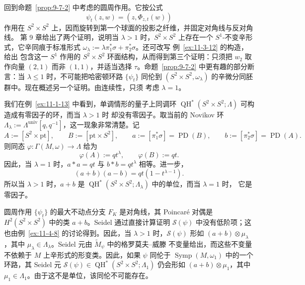 \begin{example}\label{ex:11-4-9}
回到命题~\ref{prop:9-7-2} 中考虑的圆周作用。它按公式
\[
  \psi_t(z,w)=(z,\Phi_{z,t}(w))
\]
作用在 $S^2\times S^2$ 上，因而旋转到第一个球面的投影之纤维，并固定对角线与反对角线。
第 9 章给出了两个证明，说明当 $\lambda>1$ 时，$S^2\times S^2$ 上存在一个
$S^1$-不变辛形式，它辛同痕于标准形式
$\omega_\lambda:=\lambda\pi_1^*\sigma+\pi_2^*\sigma$。还可改写
例~\ref{ex:11-3-12} 的构造，给出
包含这一 $S^1$ 作用的 $S^2\times S^2$ 环面结构，从而得到第三个证明：只须把
$w_2$ 取作向量 $(2,1)$ 而非 $(1,1)$，并适当选择 $\tau$。命题~\ref{prop:9-7-2}
中更有趣的部分断言：当 $\lambda\le1$ 时，不可能把哈密顿环路 $\{\psi_t\}$ 同伦到
$(S^2\times S^2,\omega_\lambda)$ 的辛微分同胚群中。现在概述另一个证明。由连续性，只须
考虑 $\lambda=1$。

我们在例~\ref{ex:11-1-13} 中看到，单调情形的量子上同调环
$\operatorname{QH}^*(S^2\times S^2;\Lambda)$ 可构造成有零因子的环，而当 $\lambda>1$ 时
却没有零因子。取当前的 Novikov 环
$\Lambda_\lambda:=\Lambda^{\mathrm{univ}}[q,q^{-1}]$，这一现象非常清楚。记
\[
  A:=[S^2\times\mathrm{pt}],\qquad
  B:=[\mathrm{pt}\times S^2],\qquad
  a:=[\pi_1^*\sigma]=\operatorname{PD}(B),\qquad
  b:=[\pi_2^*\sigma]=\operatorname{PD}(A).
\]
则同态 $\varphi:\Gamma(M,\omega)\to\Lambda$ 给为
\[
  \varphi(A):=qt^\lambda,
  \qquad
  \varphi(B):=qt.
\]
因此，当 $\lambda=1$ 时，$a*a=qt$ 与 $b*b=qt^\lambda$ 相等。进一步，
\[
  (a+b)(a-b)=qt(1-t^{\lambda-1}).
\]
所以当 $\lambda>1$ 时，$a+b$ 是
$\operatorname{QH}^*(S^2\times S^2;\Lambda_\lambda)$ 中的单位，而当 $\lambda=1$ 时，
它是零因子。

圆周作用 $\{\psi_t\}$ 的最大不动点分支 $F_K$ 是对角线，其 Poincar\'e 对偶是
$H^2(S^2\times S^2)$ 中的类 $a+b$。Seidel  通过直接计算证明
$\mathcal S(\psi)$ 中没有低阶项；这也由例~\ref{ex:11-4-8} 的讨论得到。因此，当
$\lambda>1$ 时，$\mathcal S(\psi)$ 形如 $(a+b)\otimes\mu_\lambda$，其中
$\mu_\lambda\in\Lambda_\lambda$。Seidel 元由 $\widetilde M_\psi$ 中的格罗莫夫--威滕
不变量给出，而这些不变量不依赖于 $M$ 上辛形式的形变类。因此，如果 $\psi$ 同伦于
$\operatorname{Symp}(M,\omega_1)$ 中的一个环路，其 Seidel 元
$\mathcal S(\psi)\in\operatorname{QH}^*(S^2\times S^2;\Lambda_1)$ 仍会形如
$(a+b)\otimes\mu_1$，其中 $\mu_1\in\Lambda_1$。由于这不是单位，该同伦不可能存在。
\end{example}

